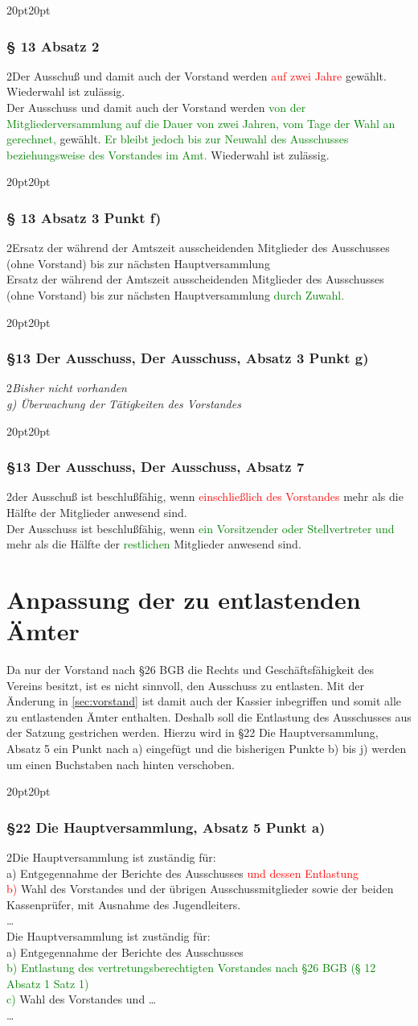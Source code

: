 \documentclass[10pt,a4paper,parskip=half]{scrartcl}
\newcommand{\new}[1]{\textcolor{Green}{#1}}
\newcommand{\old}[1]{\textcolor{Red}{#1}}
\newcommand{\change}[1]{
  \begin{adjustwidth}{20pt}{20pt}
    #1
  \end{adjustwidth}
}
\newcommand{\compare}[3]{\change{\subsubsection*{#1}\begin{multicols}{2}#2\columnbreak\\#3\end{multicols}}}
\begin{document}
\compare{§ 13 Absatz 2}{Der Ausschuß und damit auch der Vorstand werden \old{auf zwei Jahre} gewählt. Wiederwahl ist zulässig.}{Der Ausschuss und damit auch der Vorstand werden \new{von der Mitgliederversammlung auf die Dauer von zwei Jahren,
    vom Tage der Wahl an gerechnet,} gewählt. \new{Er bleibt jedoch bis zur Neuwahl des Ausschusses beziehungsweise des Vorstandes im Amt.}
  Wiederwahl ist zulässig.}

\compare{§ 13 Absatz 3 Punkt f)}{Ersatz der während der Amtszeit ausscheidenden Mitglieder des Ausschusses (ohne Vorstand) bis zur nächsten Hauptversammlung}{Ersatz der während der Amtszeit ausscheidenden Mitglieder des Ausschusses (ohne Vorstand) bis zur nächsten Hauptversammlung \new{durch Zuwahl.}}

\compare{§13 Der Ausschuss, Der Ausschuss, Absatz 3 Punkt g)}
{\em Bisher nicht vorhanden \em}
{g) Überwachung der Tätigkeiten des Vorstandes}

\compare{§13 Der Ausschuss, Der Ausschuss, Absatz 7}
{der Ausschuß ist beschlußfähig, wenn \old{einschließlich des Vorstandes} mehr als die Hälfte der Mitglieder anwesend sind.}
{Der Ausschuss ist beschlußfähig,
  wenn \new{ein Vorsitzender oder Stellvertreter und} mehr als die Hälfte der \new{restlichen} Mitglieder anwesend sind.}

\clearpage
\section{Anpassung der zu entlastenden Ämter}
Da nur der Vorstand nach §26 BGB die Rechts und Geschäftsfähigkeit des Vereins besitzt, ist es nicht sinnvoll, den Ausschuss zu entlasten. Mit der Änderung in \autoref*{sec:vorstand} ist damit auch der Kassier inbegriffen und somit alle zu entlastenden Ämter enthalten. Deshalb soll die Entlastung des Ausschusses aus der Satzung gestrichen werden. Hierzu wird in §22 Die Hauptversammlung, Absatz 5 ein Punkt nach a) eingefügt und die bisherigen Punkte b) bis j) werden um einen Buchstaben nach hinten verschoben.

\compare{§22 Die Hauptversammlung, Absatz 5 Punkt a)}
{Die Hauptversammlung ist zuständig für: \\a) Entgegennahme der Berichte des Ausschusses \old{und dessen Entlastung}\\
  \old{b)} Wahl des Vorstandes und der übrigen Ausschussmitglieder sowie der beiden Kassenprüfer, mit Ausnahme des Jugendleiters.\\\dots}
{Die Hauptversammlung ist zuständig für: \\a) Entgegennahme der Berichte des Ausschusses\\
  \new{b) Entlastung des vertretungsberechtigten Vorstandes nach §26 BGB (§ 12 Absatz 1 Satz 1)}\\
  \new{c)} Wahl des Vorstandes und \dots \\\dots}
\clearpage
\end{document}
